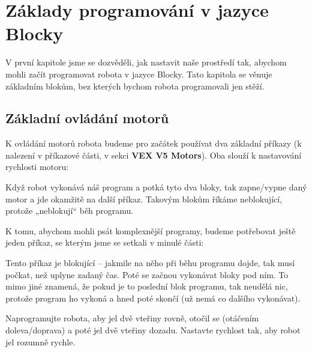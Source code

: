\documentclass[../main.tex]{subfiles}
\begin{document}
	\section{Základy programování v jazyce Blocky}
	V první kapitole jsme se dozvěděli, jak nastavit naše prostředí tak, abychom mohli začít programovat robota v jazyce Blocky. Tato kapitola se věnuje základním blokům, bez kterých bychom robota programovali jen stěží.

	\subsection{Základní ovládání motorů}
	K ovládání motorů robota budeme pro začátek používat dva základní příkazy (k nalezení v příkazové části, v sekci \textbf{VEX V5 Motors}). Oba slouží k nastavování rychlosti motoru:
	\begin{itemize}
		\blockMotorStart
		\blockMotorStop
	\end{itemize}

	Když robot vykonává náš program a potká tyto dva bloky, tak zapne/vypne daný motor a jde okamžitě na další příkaz. Takovým blokům říkáme neblokující, protože „neblokují“ běh programu.

	K tomu, abychom mohli psát komplexnější programy, budeme potřebovat ještě jeden příkaz, se kterým jsme se setkali v minulé části:
	\begin{itemize}
		\blockWait
	\end{itemize}

	Tento příkaz je blokující -- jakmile na něho při běhu programu dojde, tak musí počkat, než uplyne zadaný čas. Poté se začnou vykonávat bloky pod ním. To mimo jiné znamená, že pokud je to poslední blok programu, tak neudělá nic, protože program ho vykoná a hned poté skončí (už nemá co dalšího vykonávat).

	\begin{question}\label{que:basic}%
		Naprogramujte robota, aby jel dvě vteřiny rovně, otočil se (otáčením doleva/doprava) a poté jel dvě vteřiny dozadu. Nastavte rychlost tak, aby robot jel rozumně rychle.
	\end{question}
\end{document}
